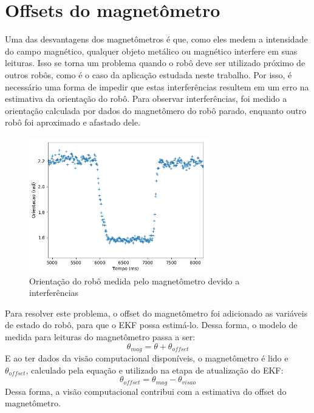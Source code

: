 \documentclass[
	12pt,				%
	openright,			%
	twoside,			%
	convert,
	a4paper,			%
	english,			%
	french,				%
	spanish,			%
	brazil				%
	]{abntex2}
\begin{document}
\section{Offsets do magnetômetro}\label{sec:mag_offset}
Uma das desvantagens dos magnetômetros é que, como eles medem a intensidade do campo magnético, qualquer objeto metálico ou magnético interfere em suas leituras. Isso se torna um problema quando o robô deve ser utilizado próximo de outros robôs, como é o caso da aplicação estudada neste trabalho. Por isso, é necessário uma forma de impedir que estas interferências resultem em um erro na estimativa da orientação do robô.
Para observar interferências, foi medido a orientação calculada por dados do magnetômero do robô parado, enquanto outro robô foi aproximado e afastado dele.
\begin{figure}[H]
	\caption{Orientação do robô medida pelo magnetômetro devido a interferências}
\begin{center}
   \includegraphics[width=0.7\textwidth]{theta_offset}
\end{center}
\end{figure}
Para resolver este problema, o offset do magnetômetro foi adicionado as variáveis de estado do robô, para que o EKF possa estimá-lo.
Dessa forma, o modelo de medida para leituras do magnetômetro passa a ser:
\begin{equation}
	\theta_{mag} = \theta + \theta_{offset}
\end{equation}
E ao ter dados da visão computacional disponíveis, o magnetômetro é lido e $\theta_{offset}$, calculado pela equação e utilizado na etapa de atualização do EKF:
\begin{equation}
	\theta_{offset} = \theta_{mag} - \theta_{visao}
\end{equation}
Dessa forma, a visão computacional contribui com a estimativa do offset do magnetômetro.
\end{document}
